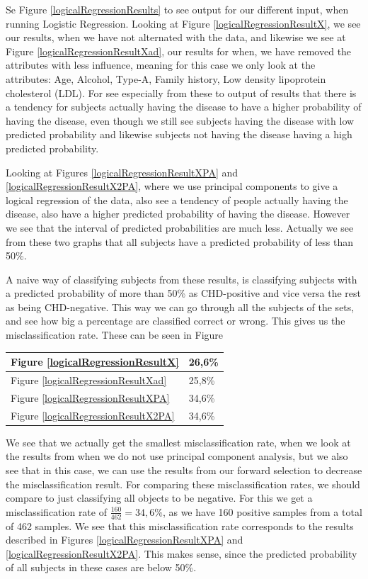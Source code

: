 Se Figure \ref{logicalRegressionResults} to see output for our different input, when running Logistic Regression. Looking at Figure \ref{logicalRegressionResultX}, we see our results, when we have not alternated with the data, and likewise we see at Figure \ref{logicalRegressionResultXad}, our results for when, we have removed the attributes with less influence, meaning for this case we only look at the attributes: Age, Alcohol, Type-A, Family history, Low density lipoprotein cholesterol (LDL). For see especially from these to output of results that there is a tendency for subjects actually having the disease to have a higher probability of having the disease, even though we still see subjects having the disease with low predicted probability and likewise subjects not having the disease having a high predicted probability.

Looking at Figures \ref{logicalRegressionResultXPA} and \ref{logicalRegressionResultX2PA}, where we use principal components to give a logical regression of the data, also see a tendency of people actually having the disease, also have a higher predicted probability of having the disease. However we see that the interval of predicted probabilities are much less. Actually we see from these two graphs that all subjects have a predicted probability of less than 50\%.

A naive way of classifying subjects from these results, is classifying subjects with a predicted probability of more than 50\% as CHD-positive and vice versa the rest as being CHD-negative. This way we can go through all the subjects of the sets, and see how big a percentage are classified correct or wrong. This gives us the misclassification rate. These can be seen in Figure

\begin{table}
\begin{tabular}{|l|l|} \hline
Figure \ref{logicalRegressionResultX} & 26,6\% \\ \hline 
Figure \ref{logicalRegressionResultXad} & 25,8\% \\ \hline
Figure \ref{logicalRegressionResultXPA} & 34,6\% \\ \hline
Figure \ref{logicalRegressionResultX2PA} & 34,6\% \\ \hline
\end{tabular}
\end{table}

We see that we actually get the smallest misclassification rate, when we look at the results from when we do not use principal component analysis, but we also see that in this case, we can use the results from our forward selection to decrease the misclassification result. For comparing these misclassification rates, we should compare to just classifying all objects to be negative. For this we get a misclassification rate of $\frac{160}{462}=34,6\%$, as we have 160 positive samples from a total of 462 samples. We see that this misclassification rate corresponds to the results described in Figures \ref{logicalRegressionResultXPA} and \ref{logicalRegressionResultX2PA}. This makes sense, since the predicted probability of all subjects in these cases are below 50\%.